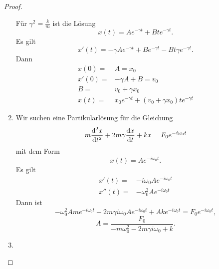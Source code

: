 \documentclass[prb,12pt]{revtex4-2}
\theoremstyle{definition}
\theoremstyle{definition}
\begin{document}
\begin{proof}
\begin{enumerate}
F\"{u}r $\gamma^2=\frac{k}{m}$ ist die L\"{o}sung
\[
	x(t)=Ae^{-\gamma t}+Bte^{-\gamma t}
.\] 
Es gilt
\[
	x'(t)=-\gamma Ae^{-\gamma t}+Be^{-\gamma t}-Bt\gamma e^{-\gamma t}
.\]
Dann
\begin{align*}
	x(0)=& A=x_0\\
	x'(0)=& -\gamma A+B=v_0\\
	B=& v_0+\gamma x_0\\
	x(t)=& x_0e^{-\gamma t}+(v_0+\gamma x_0)te^{-\gamma t}
\end{align*}
\item Wir suchen eine Partikularl\"{o}sung f\"{u}r die Gleichung
	\[
		m\dv[2]{x}{t}+2m\gamma\dv{x}{t}+kx=F_0e^{-i\omega_0t}
	\]
	mit dem Form
	\[
		x(t)=Ae^{-i\omega_0t}
	.\] 
	Es gilt
	\begin{align*}
		x'(t)=&-i\omega_0 Ae^{-i\omega_0 t} \\
		x''(t)=&-\omega_0^2 Ae^{-i\omega_0 t}
	\end{align*}
	Dann ist
	\[
		-\omega_0^2 Ame^{-i\omega_0t}-2m\gamma i\omega_0 Ae^{-i\omega_0 t}+Ake^{-i\omega_0 t}=F_0e^{-i\omega_0t}
	,\]
	\[
	A=\frac{F_0}{-m\omega_0^2-2m\gamma i\omega_0+k}
	.\] 
\item 
\end{enumerate}
\end{proof}
\end{document}
